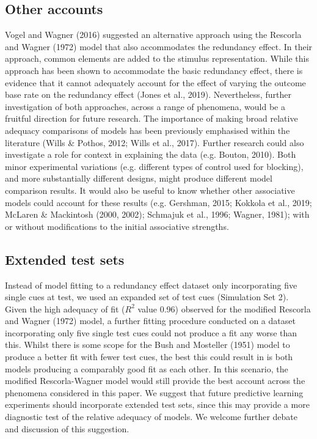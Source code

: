 \documentclass[twocolumn]{article}
\begin{document}
\subsection{Other accounts}

Vogel and Wagner (2016) suggested an
alternative approach using the Rescorla and Wagner (1972) model that
also accommodates the redundancy effect. In their approach, common
elements are added to the stimulus representation. While this approach
has been shown to accommodate the basic redundancy effect, there is
evidence that it cannot adequately account for the effect of varying the
outcome base rate on the redundancy effect (Jones et al., 2019).
Nevertheless, further investigation of both approaches, across a range
of phenomena, would be a fruitful direction for future research. The
importance of making broad relative adequacy comparisons of models has
been previously emphasised within the literature (Wills \& Pothos, 2012;
Wills et al., 2017). Further research could also investigate a role for
context in explaining the data (e.g. Bouton, 2010). Both minor
experimental variations (e.g. different types of control used for
blocking), and more substantially different designs, might produce
different model comparison results. It would also be useful to know
whether other associative models could account for these results (e.g.
Gershman, 2015; Kokkola et al., 2019; McLaren \& Mackintosh (2000,
2002); Schmajuk et al., 1996; Wagner, 1981); with or without
modifications to the initial associative strengths.

\subsection{Extended test sets}

Instead of model fitting to a redundancy
effect dataset only incorporating five single cues at test, we used an
expanded set of test cues (Simulation Set 2). Given the high adequacy of
fit ($R^2$ value 0.96) observed for the modified Rescorla
and Wagner (1972) model, a further fitting procedure conducted on a
dataset incorporating only five single test cues could not produce a fit
any worse than this. Whilst there is some scope for the Bush and
Mosteller (1951) model to produce a better fit with fewer test cues, the
best this could result in is both models producing a comparably good fit
as each other. In this scenario, the modified Rescorla-Wagner model
would still provide the best account across the phenomena considered in
this paper. We suggest that future predictive learning experiments
should incorporate extended test sets, since this may provide a more
diagnostic test of the relative adequacy of models. We welcome further
debate and discussion of this suggestion.
\end{document}
